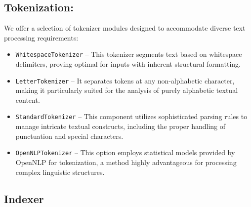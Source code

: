 \subsection{Tokenization:}
    We offer a selection of tokenizer modules designed to accommodate diverse text processing requirements:
    \begin{itemize}
        \item \texttt{WhitespaceTokenizer} – This tokenizer segments text based on whitespace delimiters, proving optimal for inputs with inherent structural formatting.
        \item \texttt{LetterTokenizer} – It separates tokens at any non-alphabetic character, making it particularly suited for the analysis of purely alphabetic textual content.
        \item \texttt{StandardTokenizer} – This component utilizes sophisticated parsing rules to manage intricate textual constructs, including the proper handling of punctuation and special characters. 
        \item \texttt{OpenNLPTokenizer} – This option employs statistical models provided by OpenNLP for tokenization, a method highly advantageous for processing complex linguistic structures.
    \end{itemize}



\subsection{Indexer}


